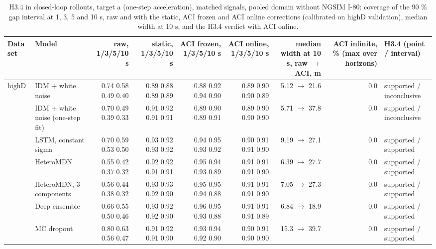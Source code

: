 \begin{table}[htbp]
\centering
\footnotesize
\caption{H3.4 in closed-loop rollouts, target a (one-step acceleration), matched signals, pooled domain without NGSIM I-80: coverage of the 90 \% gap interval at 1, 3, 5 and 10 s, raw and with the static, ACI frozen and ACI online corrections (calibrated on highD validation), median width at 10 s, and the H3.4 verdict with ACI online.}
\label{tab:t4-coverage--lodo-ngsim--a}
\begin{tabular}{llrrrrrrl}
\toprule
Data set & Model & raw, 1/3/5/10 s & static, 1/3/5/10 s & ACI frozen, 1/3/5/10 s & ACI online, 1/3/5/10 s & median width at 10 s, raw $\rightarrow$ ACI, m & ACI infinite, \% (max over horizons) & H3.4 (point / interval) \\
\midrule
highD & IDM + white noise & 0.74 0.58 0.49 0.40 & 0.89 0.88 0.89 0.89 & 0.88 0.92 0.94 0.90 & 0.89 0.90 0.90 0.89 & 5.12 $\rightarrow$ 21.6 & 0.0 & supported / inconclusive \\
 & IDM + white noise (one-step fit) & 0.70 0.49 0.39 0.33 & 0.91 0.92 0.91 0.91 & 0.89 0.90 0.89 0.91 & 0.89 0.90 0.90 0.90 & 5.71 $\rightarrow$ 37.8 & 0.0 & supported / inconclusive \\
 & LSTM, constant sigma & 0.70 0.59 0.53 0.50 & 0.93 0.92 0.93 0.92 & 0.94 0.95 0.93 0.92 & 0.90 0.91 0.91 0.90 & 9.19 $\rightarrow$ 27.1 & 0.0 & supported / supported \\
 & HeteroMDN & 0.55 0.42 0.37 0.32 & 0.92 0.92 0.91 0.91 & 0.95 0.94 0.93 0.89 & 0.91 0.91 0.91 0.90 & 6.39 $\rightarrow$ 27.7 & 0.0 & supported / supported \\
 & HeteroMDN, 3 components & 0.56 0.44 0.38 0.32 & 0.93 0.93 0.92 0.90 & 0.95 0.95 0.94 0.88 & 0.91 0.91 0.91 0.90 & 7.05 $\rightarrow$ 27.3 & 0.0 & supported / supported \\
 & Deep ensemble & 0.66 0.55 0.50 0.46 & 0.93 0.92 0.92 0.90 & 0.96 0.95 0.93 0.88 & 0.91 0.91 0.91 0.89 & 6.84 $\rightarrow$ 18.9 & 0.0 & supported / supported \\
 & MC dropout & 0.80 0.63 0.56 0.47 & 0.91 0.92 0.91 0.90 & 0.93 0.94 0.92 0.90 & 0.90 0.91 0.90 0.90 & 15.3 $\rightarrow$ 39.7 & 0.0 & supported / supported \\

\end{tabular}
\end{table}
